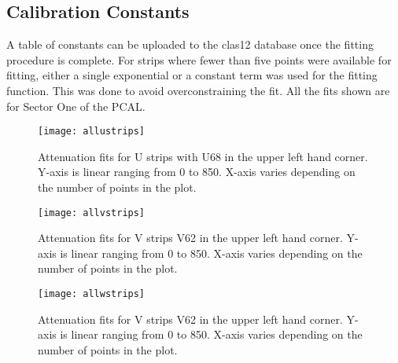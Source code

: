 \subsection{Calibration Constants}
A table of constants can be uploaded to the clas12 database once the fitting procedure is complete.
For strips where fewer than five points were available for fitting, either 
a single exponential or a constant term was used for the fitting function. This was done to avoid overconstraining the fit. All the fits shown are for Sector One of the PCAL.
\FloatBarrier
\vspace{5mm}

\begin{figure}[h]
    \centering
    \texttt{[image: allustrips]}
    \caption{Attenuation fits for U strips with U68 in the upper left hand corner. Y-axis is linear ranging from 0 to 850. X-axis varies 
    depending on the number of points in the plot.}
    \label{fig:allustrips}
\end{figure}

\FloatBarrier
\begin{figure}[h]
    \centering
    \texttt{[image: allvstrips]}
    \caption{Attenuation fits for V strips V62 in the upper left hand corner. Y-axis is linear ranging from 0 to 850. X-axis varies 
    depending on the number of points in the plot.}
    \label{fig:allvstrips}
\end{figure}


\FloatBarrier

\begin{figure}[h]
    \centering
    \texttt{[image: allwstrips]}
    \caption{Attenuation fits for V strips V62 in the upper left hand corner. Y-axis is linear ranging from 0 to 850. X-axis varies 
    depending on the number of points in the plot.}
    \label{fig:allustrips}
\end{figure}

